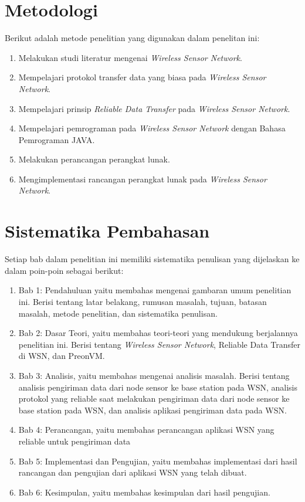 \section{Metodologi}
\label{sec:metlit}
Berikut adalah metode penelitian yang digunakan dalam penelitan ini:
\begin{enumerate}
	\item Melakukan studi literatur mengenai \textit{Wireless Sensor Network}.
	\item Mempelajari protokol transfer data yang biasa pada \textit{Wireless Sensor Network}.
	\item Mempelajari prinsip \textit{Reliable Data Transfer} pada \textit{Wireless Sensor Network}.	
	\item Mempelajari pemrograman pada \textit{Wireless Sensor Network} dengan Bahasa Pemrograman JAVA.
	\item Melakukan perancangan perangkat lunak.
	\item Mengimplementasi rancangan perangkat lunak pada \textit{Wireless Sensor Network}.
\end{enumerate}


\section{Sistematika Pembahasan}
\label{sec:sispem}
Setiap bab dalam penelitian ini memiliki sistematika penulisan yang dijelaskan ke dalam poin-poin sebagai berikut:

\begin{enumerate}
	\item Bab 1: Pendahuluan yaitu membahas mengenai gambaran umum penelitian ini. Berisi tentang latar belakang, rumusan masalah, tujuan, batasan masalah, metode penelitian, dan sistematika penulisan.
	\item Bab 2: Dasar Teori, yaitu membahas teori-teori yang mendukung berjalannya penelitian ini. Berisi tentang \textit{Wireless Sensor Network}, Reliable Data Transfer di WSN, dan PreonVM.
	\item Bab 3: Analisis, yaitu membahas mengenai analisis masalah. Berisi tentang analisis pengiriman data dari node sensor ke base station pada WSN, analisis protokol yang reliable saat melakukan pengiriman data dari node sensor ke base station pada WSN, dan analisis aplikasi pengiriman data pada WSN.
	\item Bab 4: Perancangan, yaitu membahas perancangan aplikasi WSN yang reliable untuk pengiriman data
	\item Bab 5: Implementasi dan Pengujian, yaitu membahas implementasi dari hasil rancangan dan pengujian dari aplikasi WSN yang telah dibuat.
	\item Bab 6: Kesimpulan, yaitu membahas kesimpulan dari hasil pengujian.
\end{enumerate}
	